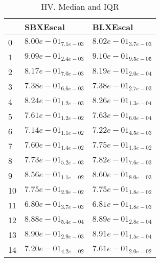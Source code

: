 \documentclass{article}
\begin{document}
\
\begin{table}
\caption{HV. Median and IQR}
\label{table:median.HV}
\begin{scriptsize}
\centering
\begin{tabular}{lll}
\hline & SBXEscal &  BLXEscal\\
\hline
0 & \cellcolor{gray25}$  8.00e-01_{ 7.1e-03}$ & \cellcolor{gray95}$  8.02e-01_{ 3.7e-03}$ \\
1 & \cellcolor{gray25}$  9.09e-01_{ 2.4e-03}$ & \cellcolor{gray95}$  9.10e-01_{ 9.5e-05}$ \\
2 & \cellcolor{gray25}$  8.17e-01_{ 7.0e-03}$ & \cellcolor{gray95}$  8.19e-01_{ 2.0e-04}$ \\
3 & \cellcolor{gray25}$  7.38e-01_{ 6.6e-03}$ & \cellcolor{gray95}$  7.38e-01_{ 2.7e-03}$ \\
4 & \cellcolor{gray25}$  8.24e-01_{ 1.2e-03}$ & \cellcolor{gray95}$  8.26e-01_{ 1.3e-04}$ \\
5 & \cellcolor{gray25}$  7.61e-01_{ 1.2e-02}$ & \cellcolor{gray95}$  7.63e-01_{ 6.0e-04}$ \\
6 & \cellcolor{gray25}$  7.14e-01_{ 1.1e-02}$ & \cellcolor{gray95}$  7.22e-01_{ 4.5e-03}$ \\
7 & \cellcolor{gray25}$  7.60e-01_{ 1.4e-02}$ & \cellcolor{gray95}$  7.75e-01_{ 1.3e-02}$ \\
8 & \cellcolor{gray25}$  7.73e-01_{ 5.2e-03}$ & \cellcolor{gray95}$  7.82e-01_{ 7.6e-03}$ \\
9 & \cellcolor{gray25}$  8.56e-01_{ 1.1e-02}$ & \cellcolor{gray95}$  8.60e-01_{ 8.0e-03}$ \\
10 & \cellcolor{gray25}$  7.75e-01_{ 2.9e-02}$ & \cellcolor{gray95}$  7.75e-01_{ 1.8e-02}$ \\
11 & \cellcolor{gray25}$  6.80e-01_{ 3.7e-03}$ & \cellcolor{gray95}$  6.81e-01_{ 1.8e-03}$ \\
12 & \cellcolor{gray25}$  8.88e-01_{ 5.4e-04}$ & \cellcolor{gray95}$  8.89e-01_{ 2.8e-04}$ \\
13 & \cellcolor{gray25}$  8.90e-01_{ 2.9e-03}$ & \cellcolor{gray95}$  8.91e-01_{ 1.5e-04}$ \\
14 & \cellcolor{gray25}$  7.20e-01_{ 4.2e-02}$ & \cellcolor{gray95}$  7.61e-01_{ 2.0e-02}$ \\
\hline
\end{tabular}
\end{scriptsize}
\end{table}
\
\end{document}

